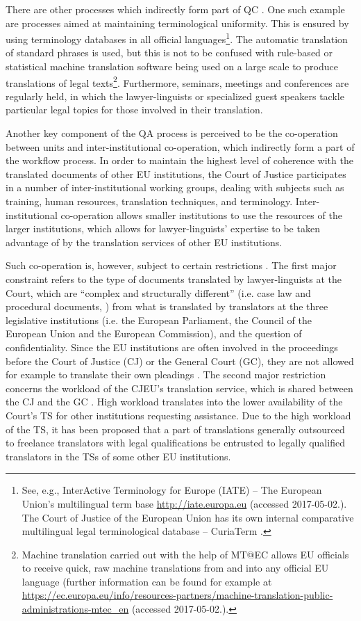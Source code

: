 \documentclass[output=paper]{langsci/langscibook}
\begin{document}
There are other processes which indirectly form part of QC \citep{Izzo2014b}. One such example are processes aimed at maintaining terminological uniformity. This is ensured by using terminology databases in all official languages\footnote{See, e.g., InterActive Terminology for Europe (IATE) – The European Union’s multilingual term base \url{http://iate.europa.eu} (accessed 2017-05-02.). The Court of Justice of the European Union has its own internal comparative multilingual legal terminological database – CuriaTerm \citep[259]{Künnecke2013}.}. The automatic translation of standard phrases is used, but this is not to be confused with rule-based or statistical machine translation software being used on a large scale to produce translations of legal texts\footnote{Machine translation carried out with the help of MT@EC allows EU officials to receive quick, raw machine translations from and into any official EU language (further information can be found for example at \url{https://ec.europa.eu/info/resources-partners/machine-translation-public-administrations-mtec_en} (accessed 2017-05-02.).}. Furthermore, seminars, meetings and conferences are regularly held, in which the lawyer-linguists or specialized guest speakers tackle particular legal topics for those involved in their translation.

Another key component of the QA process is perceived to be the co-operation between units and inter-institutional co-operation, which indirectly form a part of the workflow process. In order to maintain the highest level of coherence with the translated documents of other EU institutions, the Court of Justice participates in a number of inter-institutional working groups, dealing with subjects such as training, human resources, translation techniques, and terminology. Inter-institutional co-operation allows smaller institutions to use the resources of the larger institutions, which allows for lawyer-linguists’ expertise to be taken advantage of by the translation services of other EU institutions.

Such co-operation is, however, subject to certain restrictions \citep[1]{Annex2010}. The first major constraint refers to the type of documents translated by lawyer-linguists at the Court, which are “complex and structurally different” (i.e. case law and procedural documents, \citealt{Annex2010}) from what is translated by translators at the three legislative institutions (i.e. the European Parliament, the Council of the European Union and the European Commission), and the question of confidentiality. Since the EU institutions are often involved in the proceedings before the Court of Justice (CJ) or the General Court (GC), they are not allowed for example to translate their own pleadings \citep[2]{Annex2010}. The second major restriction concerns the workload of the CJEU’s translation service, which is shared between the CJ and the GC \citep[2]{Annex2010}. High workload translates into the lower availability of the Court’s TS for other institutions requesting assistance. Due to the high workload of the TS, it has been proposed that a part of translations generally outsourced to freelance translators with legal qualifications be entrusted to legally qualified translators in the TSs of some other EU institutions.
\end{document}
